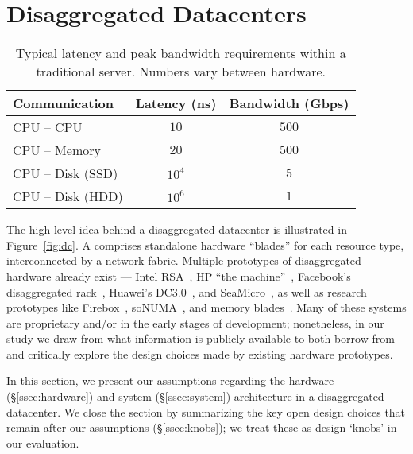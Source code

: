 \vspace{-0.1in}
\section{Disaggregated Datacenters}
\label{sec:summary}
\vspace{-0.05in}


\begin{table}
  \centering
  \small
  \begin{tabular}{l|c|c}
		\textbf{Communication} & \textbf{Latency (ns)} & \textbf{Bandwidth (Gbps)}\\\hline
	\hline
    CPU -- CPU & $10$ & $500$\\\hline
    CPU -- Memory & $20$ & $500$\\\hline
    CPU -- Disk (SSD) & $10^4$ & $5$\\\hline
    CPU -- Disk (HDD) & $10^6$ & $1$\\\hline
    \hline
  \end{tabular}
  \vspace{0.1in}
  \caption{\small{Typical latency and peak bandwidth requirements within a traditional server. Numbers vary between hardware.}}
  \label{tab:tech}
\end{table}

The high-level idea behind a disaggregated datacenter is illustrated in Figure~\ref{fig:dc}.
A \dis comprises standalone hardware ``blades'' for each resource type,  interconnected by a network fabric.
Multiple prototypes of disaggregated hardware already exist --- Intel RSA~\cite{rsa}, HP ``the machine''~\cite{hptm}, Facebook's disaggregated rack~\cite{fdr}, Huawei's DC3.0~\cite{huawei}, and SeaMicro~\cite{seamicro}, as well as research prototypes like Firebox~\cite{firebox}, soNUMA~\cite{sonuma}, and memory blades~\cite{ddcHwDesign1}. 
Many of these systems are proprietary and/or in the early stages of development; nonetheless, in our study we draw from what information is publicly available to both borrow from and critically explore the design choices made by existing hardware prototypes.

In this section, we present our assumptions regarding the hardware (\S\ref{ssec:hardware}) and system (\S\ref{ssec:system}) architecture in a disaggregated datacenter.
We close the section by summarizing the key open design choices that remain after our assumptions (\S\ref{ssec:knobs}); we treat these as design `knobs' in our evaluation.


